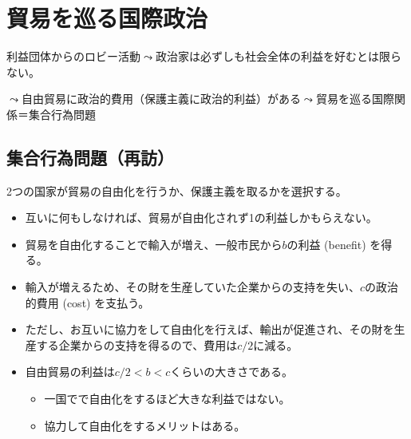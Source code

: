 \documentclass[
  xelatex,
  ja=standard]{bxjsarticle}
\providecommand{\tightlist}{%
  \setlength{\itemsep}{0pt}\setlength{\parskip}{0pt}}\usepackage{longtable,booktabs,array}
\begin{document}
\hypertarget{ux8cbfux6613ux3092ux5de1ux308bux56fdux969bux653fux6cbb}{%
\section{貿易を巡る国際政治}\label{ux8cbfux6613ux3092ux5de1ux308bux56fdux969bux653fux6cbb}}

利益団体からのロビー活動\(\leadsto\)政治家は必ずしも社会全体の利益を好むとは限らない。

\(\leadsto\)自由貿易に政治的費用（保護主義に政治的利益）がある\(\leadsto\)貿易を巡る国際関係＝集合行為問題

\hypertarget{ux96c6ux5408ux884cux70baux554fux984cux518dux8a2a}{%
\subsection{集合行為問題（再訪）}\label{ux96c6ux5408ux884cux70baux554fux984cux518dux8a2a}}

\begin{tcolorbox}[enhanced jigsaw, left=2mm, colframe=quarto-callout-tip-color-frame, colback=white, coltitle=black, rightrule=.15mm, title=\textcolor{quarto-callout-tip-color}{\faLightbulb}\hspace{0.5em}{自由貿易を巡る国際関係}, arc=.35mm, toprule=.15mm, bottomrule=.15mm, leftrule=.75mm, bottomtitle=1mm, toptitle=1mm, titlerule=0mm, breakable, opacitybacktitle=0.6, colbacktitle=quarto-callout-tip-color!10!white, opacityback=0]

2つの国家が貿易の自由化を行うか、保護主義を取るかを選択する。

\begin{itemize}
\tightlist
\item
  互いに何もしなければ、貿易が自由化されず1の利益しかもらえない。
\item
  貿易を自由化することで輸入が増え、一般市民から\(b\)の利益 (benefit)
  を得る。
\item
  輸入が増えるため、その財を生産していた企業からの支持を失い、\(c\)の政治的費用
  (cost) を支払う。
\item
  ただし、お互いに協力をして自由化を行えば、輸出が促進され、その財を生産する企業からの支持を得るので、費用は\(c/2\)に減る。
\item
  自由貿易の利益は\(c/2 < b < c\)くらいの大きさである。

  \begin{itemize}
  \tightlist
  \item
    一国でで自由化をするほど大きな利益ではない。
  \item
    協力して自由化をするメリットはある。
  \end{itemize}
\end{itemize}

\end{tcolorbox}
\end{document}
